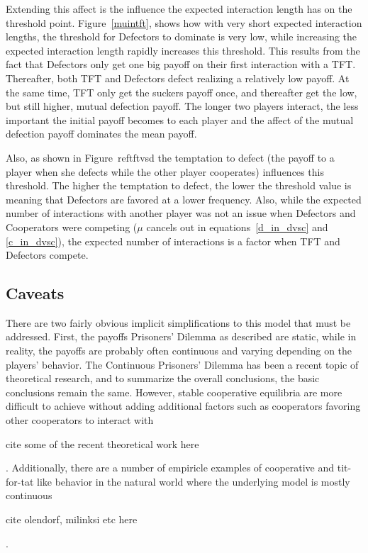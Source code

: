 \documentclass[11pt]{article} %
\begin{document}
Extending this affect is the influence the expected interaction length has on the threshold point.  Figure~\ref{muintft}, shows how with very short expected interaction lengths, the threshold for Defectors to dominate is very low, while increasing the expected interaction length rapidly increases this threshold. This results from the fact that Defectors only get one big payoff on their first interaction with a TFT. Thereafter, both TFT and Defectors defect realizing a relatively low payoff. At the same time, TFT only get the suckers payoff once, and thereafter get the low, but still higher, mutual defection payoff. The longer two players interact, the less important the initial payoff becomes to each player and the affect of the mutual defection payoff dominates the mean payoff.

Also, as shown in Figure~ref{tftvsd} the temptation to defect (the payoff to a player when she defects while the other player cooperates) influences this threshold. The higher the temptation to defect, the lower the threshold value is meaning that Defectors are favored at a lower frequency. Also, while the expected number of interactions with another player was not an issue when Defectors and Cooperators were competing ($\mu$ cancels out in equations~\ref{d_in_dvsc} and \ref{c_in_dvsc}), the expected number of interactions is a factor when TFT and Defectors compete. 

\subsection{Caveats}
There are two fairly obvious implicit simplifications to this model that must be addressed. First, the payoffs Prisoners' Dilemma as described are static, while in reality, the payoffs are probably often continuous and varying depending on the players' behavior. The Continuous Prisoners' Dilemma has been a recent topic of theoretical research, and to summarize the overall conclusions, the basic conclusions remain the same. However, stable cooperative equilibria are more difficult to achieve without adding additional factors such as cooperators favoring other cooperators to interact with \begin{em}cite some of the recent theoretical work here\end{em}. Additionally, there are a number of empiricle examples of cooperative and tit-for-tat like behavior in the natural world where the underlying model is mostly continuous \begin{em}cite olendorf, milinksi etc here\end{em}.
\end{document}
